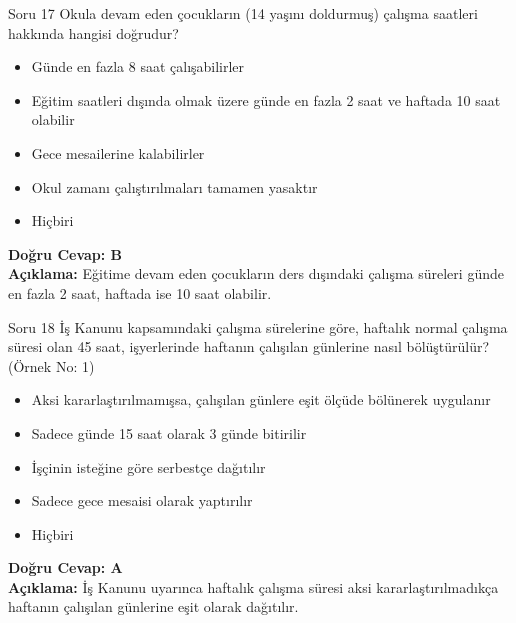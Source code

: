 \documentclass[12pt,a4paper]{article}
\begin{document}
\begin{testcard}{Soru 17}
    Okula devam eden çocukların (14 yaşını doldurmuş) çalışma saatleri hakkında hangisi doğrudur?
    \begin{itemize}
        \item[A)] Günde en fazla 8 saat çalışabilirler
        \item[B)] Eğitim saatleri dışında olmak üzere günde en fazla 2 saat ve haftada 10 saat olabilir
        \item[C)] Gece mesailerine kalabilirler
        \item[D)] Okul zamanı çalıştırılmaları tamamen yasaktır
        \item[E)] Hiçbiri
    \end{itemize}
    \tcblower
    \textbf{Doğru Cevap: B} \\
    \textbf{Açıklama:} Eğitime devam eden çocukların ders dışındaki çalışma süreleri günde en fazla 2 saat, haftada ise 10 saat olabilir.
\end{testcard}

\begin{testcard}{Soru 18}
    İş Kanunu kapsamındaki çalışma sürelerine göre, haftalık normal çalışma süresi olan 45 saat, işyerlerinde haftanın çalışılan günlerine nasıl bölüştürülür? (Örnek No: 1)
    \begin{itemize}
        \item[A)] Aksi kararlaştırılmamışsa, çalışılan günlere eşit ölçüde bölünerek uygulanır
        \item[B)] Sadece günde 15 saat olarak 3 günde bitirilir
        \item[C)] İşçinin isteğine göre serbestçe dağıtılır
        \item[D)] Sadece gece mesaisi olarak yaptırılır
        \item[E)] Hiçbiri
    \end{itemize}
    \tcblower
    \textbf{Doğru Cevap: A} \\
    \textbf{Açıklama:} İş Kanunu uyarınca haftalık çalışma süresi aksi kararlaştırılmadıkça haftanın çalışılan günlerine eşit olarak dağıtılır.
\end{testcard}
\end{document}
